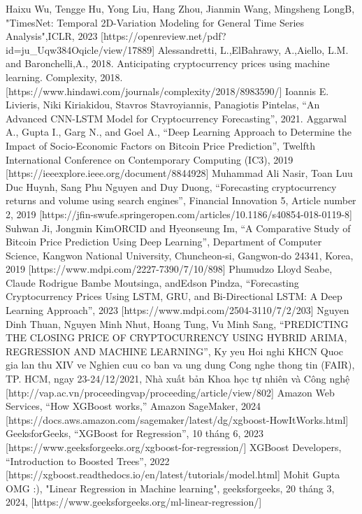 \documentclass[conference]{IEEEtran}
\begin{document}
\begin{thebibliography}{9}

 Haixu Wu, Tengge Hu, Yong Liu, Hang Zhou, Jianmin Wang, Mingsheng LongB, "TimesNet: Temporal 2D-Variation Modeling for General Time Series Analysis",ICLR, 2023 [https://openreview.net/pdf?id=ju\_Uqw384Oqicle/view/17889]
 Alessandretti, L.,ElBahrawy, A.,Aiello, L.M. and Baronchelli,A., 2018. Anticipating cryptocurrency prices using machine learning. Complexity, 2018. [https://www.hindawi.com/journals/complexity/2018/8983590/]
 Ioannis E. Livieris, Niki Kiriakidou, Stavros Stavroyiannis, Panagiotis Pintelas, “An Advanced CNN-LSTM Model for 
Cryptocurrency Forecasting”, 2021.
 Aggarwal A., Gupta I., Garg N., and Goel A., “Deep Learning Approach to Determine the Impact of Socio-Economic Factors on Bitcoin Price Prediction”, Twelfth International Conference on Contemporary Computing (IC3), 2019 [https://ieeexplore.ieee.org/document/8844928]
 Muhammad Ali Nasir, Toan Luu Duc Huynh, Sang Phu Nguyen and Duy Duong, “Forecasting cryptocurrency returns and volume using search engines”, Financial Innovation 5, Article number 2, 2019 [https://jfin-swufe.springeropen.com/articles/10.1186/s40854-018-0119-8]
 Suhwan Ji, Jongmin KimORCID and Hyeonseung Im, “A Comparative Study of Bitcoin Price Prediction Using Deep Learning”, Department of Computer Science, Kangwon National University, Chuncheon-si, Gangwon-do 24341, Korea, 2019 [https://www.mdpi.com/2227-7390/7/10/898]
 Phumudzo Lloyd Seabe, Claude Rodrigue Bambe Moutsinga, andEdson Pindza, “Forecasting Cryptocurrency Prices Using LSTM, GRU, and Bi-Directional LSTM: A Deep Learning Approach”, 2023 [https://www.mdpi.com/2504-3110/7/2/203]
 Nguyen Dinh Thuan, Nguyen Minh Nhut, Hoang Tung, Vu Minh Sang, “PREDICTING THE CLOSING PRICE OF CRYPTOCURRENCY USING HYBRID ARIMA, REGRESSION AND MACHINE LEARNING”, Ky yeu Hoi nghi KHCN Quoc gia lan thu XIV ve Nghien cuu co ban va ung dung Cong nghe thong tin (FAIR), TP. HCM, ngay 23-24/12/2021, Nhà xuất bản Khoa học tự nhiên và Công nghệ [http://vap.ac.vn/proceedingvap/proceeding/article/view/802]
 Amazon Web Services, “How XGBoost works,” Amazon SageMaker, 2024 [https://docs.aws.amazon.com/sagemaker/latest/dg/xgboost-HowItWorks.html]
 GeeksforGeeks, “XGBoost for Regression”, 10 tháng 6, 2023 [https://www.geeksforgeeks.org/xgboost-for-regression/]
 XGBoost Developers, “Introduction to Boosted Trees”, 2022 [https://xgboost.readthedocs.io/en/latest/tutorials/model.html]
 Mohit Gupta OMG :), "Linear Regression in Machine learning", geeksforgeeks, 20 tháng 3, 2024, [https://www.geeksforgeeks.org/ml-linear-regression/]
\end{thebibliography}
\end{document}
